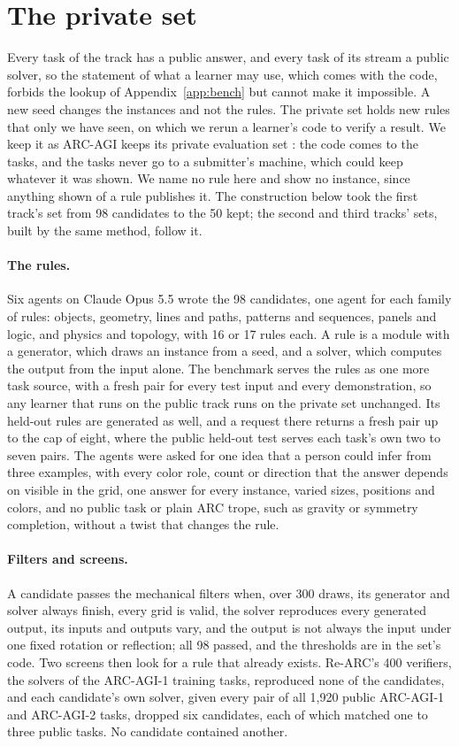 \section{The private set}
\label{app:heldout}

Every task of the track has a public answer, and every task of its stream a public solver, so the statement of what a learner may use, which comes with the code, forbids the lookup of Appendix~\ref{app:bench} but cannot make it impossible. A new seed changes the instances and not the rules. The private set holds new rules that only we have seen, on which we rerun a learner's code to verify a result. We keep it as ARC-AGI keeps its private evaluation set \citep{chollet2025arcagi2}: the code comes to the tasks, and the tasks never go to a submitter's machine, which could keep whatever it was shown. We name no rule here and show no instance, since anything shown of a rule publishes it. The construction below took the first track's set from 98 candidates to the 50 kept; the second and third tracks' sets, built by the same method, follow it.

\paragraph{The rules.} Six agents on Claude Opus 5.5 wrote the 98 candidates, one agent for each family of rules: objects, geometry, lines and paths, patterns and sequences, panels and logic, and physics and topology, with 16 or 17 rules each. A rule is a module with a generator, which draws an instance from a seed, and a solver, which computes the output from the input alone. The benchmark serves the rules as one more task source, with a fresh pair for every test input and every demonstration, so any learner that runs on the public track runs on the private set unchanged. Its held-out rules are generated as well, and a request there returns a fresh pair up to the cap of eight, where the public held-out test serves each task's own two to seven pairs. The agents were asked for one idea that a person could infer from three examples, with every color role, count or direction that the answer depends on visible in the grid, one answer for every instance, varied sizes, positions and colors, and no public task or plain ARC trope, such as gravity or symmetry completion, without a twist that changes the rule.

\paragraph{Filters and screens.} A candidate passes the mechanical filters when, over 300 draws, its generator and solver always finish, every grid is valid, the solver reproduces every generated output, its inputs and outputs vary, and the output is not always the input under one fixed rotation or reflection; all 98 passed, and the thresholds are in the set's code. Two screens then look for a rule that already exists. Re-ARC's 400 verifiers, the solvers of the ARC-AGI-1 training tasks, reproduced none of the candidates, and each candidate's own solver, given every pair of all 1{,}920 public ARC-AGI-1 and ARC-AGI-2 tasks, dropped six candidates, each of which matched one to three public tasks. No candidate contained another.

